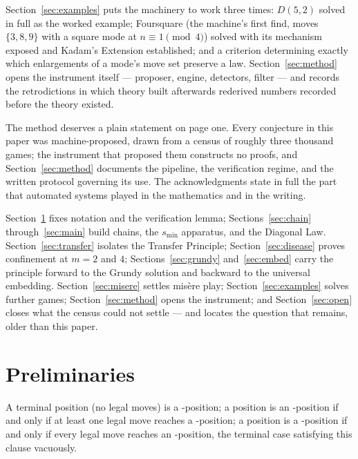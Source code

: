 Section~\ref{sec:examples} puts the machinery to work three times:
$D(5, 2)$ solved in full as the worked example; Foursquare (the
machine's first find, moves $\{3, 8, 9\}$ with a square mode at
$n \equiv 1 \pmod 4$) solved with its mechanism exposed and Kadam's
Extension established; and a criterion determining exactly which
enlargements of a mode's move set preserve a law.
Section~\ref{sec:method} opens the instrument itself --- proposer,
engine, detectors, filter --- and records the retrodictions in which
theory built afterwards rederived numbers recorded before the theory
existed.

The method deserves a plain statement on page one. Every conjecture in
this paper was machine-proposed, drawn from a census of roughly three
thousand games; the instrument that proposed them constructs no proofs,
and Section~\ref{sec:method} documents the pipeline, the verification
regime, and the written protocol governing its use. The acknowledgments
state in full the part that automated systems played in the mathematics
and in the writing.

Section~\ref{sec:prelim} fixes notation and the verification lemma;
Sections~\ref{sec:chain} through~\ref{sec:main} build chains, the
$s_{\min}$ apparatus, and the Diagonal Law.
Section~\ref{sec:transfer} isolates the Transfer Principle;
Section~\ref{sec:disease} proves confinement at $m = 2$ and $4$;
Sections~\ref{sec:grundy} and~\ref{sec:embed} carry the principle forward
to the Grundy solution and backward to the universal embedding.
Section~\ref{sec:misere} settles mis\`ere play;
Section~\ref{sec:examples} solves further games;
Section~\ref{sec:method} opens the instrument; and
Section~\ref{sec:open} closes what the census could not settle --- and
locates the question that remains, older than this paper.

\section{Preliminaries}\label{sec:prelim}

\begin{definition}\label{def:pn}
A terminal position (no legal moves) is a \PP-position; a position is an
\NN-position if and only if at least one legal move reaches a
\PP-position; a position is a \PP-position if and only if every legal
move reaches an \NN-position, the terminal case satisfying this clause
vacuously.
\end{definition}

